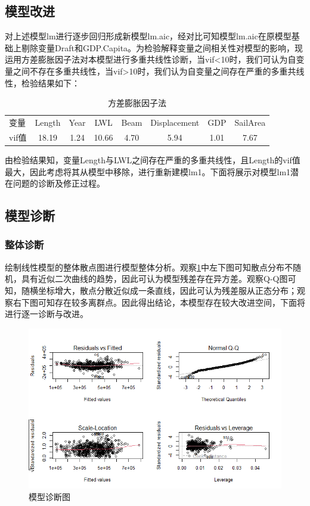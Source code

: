 \documentclass[a4paper,12pt,onecolumn,oneside]{article}
\begin{document}
	\subsection{模型改进}
对上述模型lm进行逐步回归形成新模型lm.aic，经对比可知模型lm.aic在原模型基础上剔除变量Draft和GDP.Capita。为检验解释变量之间相关性对模型的影响，现运用方差膨胀因子法对本模型进行多重共线性诊断，当vif<10时，我们可认为自变量之间不存在多重共线性，当vif>10时，我们认为自变量之间存在严重的多重共线性，检验结果如下：\par 
\begin{table}[htbp]
	\centering
	\caption{方差膨胀因子法}\vspace{0.5\baselineskip}
	\label{tab:vif}
	\begin{tabular}{@{}lccccccc@{}}
		\toprule
		变量 & Length & Year & LWL & Beam & Displacement & GDP & SailArea \\
		vif值 & 18.19 & 1.24 & 10.66 & 4.70 & 5.94 & 1.01 & 7.67 
		\\\bottomrule
	\end{tabular}
\end{table}
由检验结果知，变量Length与LWL之间存在严重的多重共线性，且Length的vif值最大，因此考虑将其从模型中移除，进行重新建模lm1。下面将展示对模型lm1潜在问题的诊断及修正过程。
\subsection{模型诊断}
\subsubsection{整体诊断}
绘制线性模型的整体散点图进行模型整体分析。观察\ref{fig:tu231}中左下图可知散点分布不随机，具有近似二次曲线的趋势，因此可认为模型残差存在异方差。观察Q-Q图可知，随横坐标增大，散点分散近似成一条直线，因此可认为残差服从正态分布；观察右下图可知存在较多离群点。因此得出结论，本模型存在较大改进空间，下面将进行逐一诊断与改进。
	\begin{figure}[H]
	\centering
	\includegraphics[width=\textwidth]{res/tu231.png}
	\caption{模型诊断图}
	\label{fig:tu231}
\end{figure}
\end{document}
